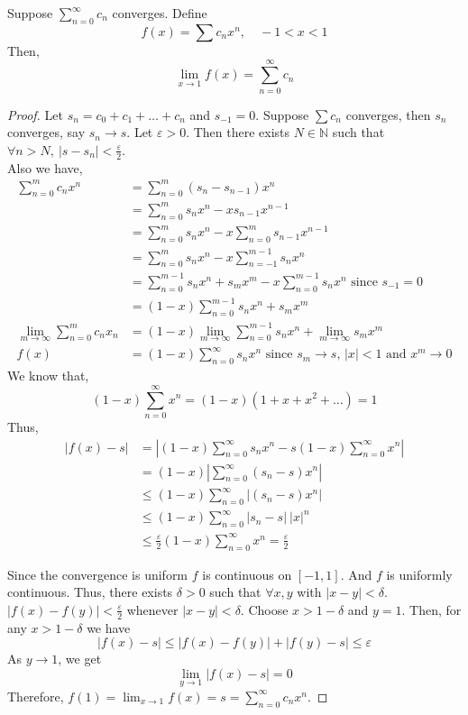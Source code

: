 \begin{theorem}
	Suppose $\displaystyle \sum_{n = 0}^\infty c_n$ converges.
	Define \[ f(x) = \sum c_n x^n,\quad -1<x<1 \]
	Then,
	\[ \lim_{x \to 1} f(x) = \sum_{n=0}^\infty c_n \]
\end{theorem}
\begin{proof}
	Let $s_n = c_0 + c_1 + \dots + c_n$ and $s_{-1} = 0$.
	Suppose $\sum c_n$ converges, then $s_n$ converges, say $s_n \to s$.
	Let $\varepsilon > 0$.
	Then there exists $N \in \mathbb{N}$ such that $\forall n > N,\ |s-s_n| < \frac{\varepsilon}{2}$.\\

	Also we have,
	\begin{align*}
		\sum_{n=0}^m c_n x^n
		& = \sum_{n=0}^m (s_n-s_{n-1})x^n \\
		& = \sum_{n=0}^m s_n x^n - xs_{n-1}x^{n-1} \\
		& = \sum_{n=0}^m s_nx^n - x\sum_{n=0}^{m}s_{n-1}x^{n-1} \\
		& = \sum_{n=0}^m s_nx^n - x\sum_{n=-1}^{m-1}s_nx^n \\
		& = \sum_{n=0}^{m-1} s_nx^n + s_mx^m - x\sum_{n=0}^{m-1}s_nx^n \text{ since $s_{-1} = 0$} \\
		& = (1-x)\sum_{n=0}^{m-1} s_nx^n + s_mx^m \\
		\lim_{m \to \infty} \sum_{n=0}^m c_n x_n
		& = (1-x) \lim_{m \to \infty} \sum_{n=0}^{m-1} s_nx^n + \lim_{m \to \infty} s_m x^m  \\
		f(x) & = (1-x) \sum_{n=0}^\infty s_nx^n \text{ since $s_m \to s$, $|x|<1$ and $x^m \to 0$}
	\end{align*}
	We know that,
	\[ (1-x)\sum_{n=0}^\infty x^n = (1-x)(1+x+x^2+\dots) = 1 \]
	Thus,
	\begin{align*}
		|f(x) - s| 
		& = \left| (1-x)\sum_{n=0}^\infty s_nx^n - s(1-x)\sum_{n=0}^\infty x^n \right| \\
		& = (1-x) \left| \sum_{n=0}^\infty (s_n-s)x^n \right| \\
		& \le (1-x) \sum_{n=0}^\infty |(s_n-s)x^n| \\
		& \le (1-x)\sum_{n=0}^\infty |s_n-s|\ |x|^n  \\
		& \le \frac{\varepsilon}{2} (1-x) \sum_{n=0}^\infty x^n = \frac{\varepsilon}{2}
	\end{align*}
	
	Since the convergence is uniform $f$ is continuous on $[-1,1]$.
	And $f$ is uniformly continuous.
	Thus, there exists $\delta > 0$ such that $\forall x, y$ with $|x-y| < \delta$.
	$|f(x)-f(y)| < \frac{\varepsilon}{2}$ whenever $|x-y| < \delta$.
	Choose $x > 1-\delta$ and $y = 1$.
	Then, for any $x > 1-\delta$ we have
	\[ | f(x) - s| \le |f(x) - f(y)| + |f(y) - s| \le \varepsilon \]
	As $y \to 1$, we get
	\[ \lim_{y \to 1} |f(x) - s| = 0 \]
	Therefore, $f(1) = \lim_{x \to 1} f(x) = s = \sum_{n = 0}^\infty c_nx^n$.
\end{proof}

